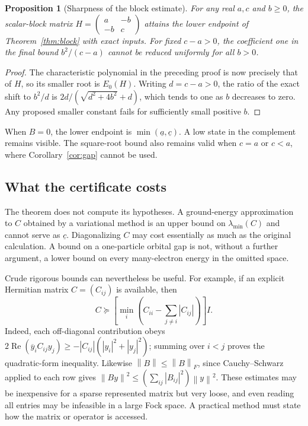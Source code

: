 \documentclass[11pt,a4paper]{article}
\theoremstyle{plain}
\newtheorem{proposition}[theorem]{Proposition}
\theoremstyle{definition}
\theoremstyle{remark}
\newcommand{\norm}[1]{\left\lVert #1\right\rVert}
\begin{document}
\begin{proposition}[Sharpness of the block estimate]
\label{prop:sharp}
For any real $a,c$ and $b\ge0$, the scalar-block matrix
$H=\left(\begin{smallmatrix}a&-b\\-b&c\end{smallmatrix}\right)$
attains the lower endpoint of Theorem~\ref{thm:block} with exact inputs.
For fixed $c-a>0$, the coefficient one in the final bound
$b^2/(c-a)$ cannot be reduced uniformly for all $b>0$.
\end{proposition}
\begin{proof}
The characteristic polynomial in the preceding proof is now precisely that
of $H$, so its smaller root is $E_0(H)$. Writing $d=c-a>0$, the ratio
of the exact shift to $b^2/d$ is
$2d/(\sqrt{d^2+4b^2}+d)$, which tends to one as $b$ decreases to zero.
Any proposed smaller constant fails for sufficiently small positive $b$.
\end{proof}

When $B=0$, the lower endpoint is $\min(\underline a,\underline c)$.
A low state in the complement remains visible. The square-root bound also
remains valid when $c=a$ or $c<a$, where Corollary~\ref{cor:gap} cannot
be used.

\subsection{What the certificate costs}
The theorem does not compute its hypotheses. A ground-energy approximation
to $C$ obtained by a variational method is an upper bound on
$\lambda_{\min}(C)$ and cannot serve as $\underline c$.
Diagonalizing $C$ may cost essentially as much as the original calculation.
A bound on a one-particle orbital gap is not, without a further argument,
a lower bound on every many-electron energy in the omitted space.

Crude rigorous bounds can nevertheless be useful. For example, if an explicit
Hermitian matrix $C=(C_{ij})$ is available, then
\begin{equation}
 C\succeq
 \left[\min_i\left(C_{ii}-\sum_{j\ne i}|C_{ij}|\right)\right]I.
 \label{eq:row-bound}
\end{equation}
Indeed, each off-diagonal contribution obeys
$2\operatorname{Re}(\overline y_i C_{ij}y_j)
\ge-|C_{ij}|(|y_i|^2+|y_j|^2)$; summing over $i<j$ proves the
quadratic-form inequality. Likewise $\norm B\le\norm B_F$, since
Cauchy--Schwarz applied to each row gives
$\norm{By}^2\le(\sum_{ij}|B_{ij}|^2)\norm y^2$.
These estimates may be inexpensive for a sparse represented matrix but very
loose, and even reading all entries may be infeasible in a large Fock space.
A practical method must state how the matrix or operator is accessed.
\end{document}
